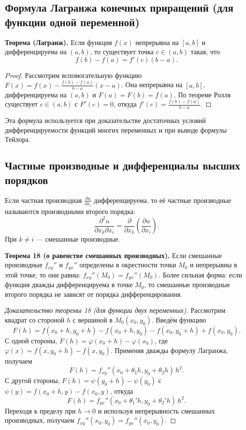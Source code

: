 \documentclass{article}
\theoremstyle{definition}
\begin{document}
\subsection{Формула Лагранжа конечных приращений (для функции одной переменной)}
\textbf{Теорема (Лагранж).} Если функция $f(x)$ непрерывна на $[a,b]$ и дифференцируема на $(a,b)$, то существует точка $c\in(a,b)$ такая, что
\[
f(b)-f(a)=f'(c)(b-a).
\]
\begin{proof}
Рассмотрим вспомогательную функцию $F(x)=f(x)-\frac{f(b)-f(a)}{b-a}(x-a)$. Она непрерывна на $[a,b]$, дифференцируема на $(a,b)$ и $F(a)=F(b)=f(a)$. По теореме Ролля существует $c\in(a,b)$ с $F'(c)=0$, откуда $f'(c)=\frac{f(b)-f(a)}{b-a}$.
\end{proof}
Эта формула используется при доказательстве достаточных условий дифференцируемости функций многих переменных и при выводе формулы Тейлора.

\subsection{Частные производные и дифференциалы высших порядков}
Если частная производная $\frac{\partial u}{\partial x_i}$ дифференцируема, то её частные производные называются производными второго порядка:
\[
\frac{\partial^2 u}{\partial x_k\partial x_i}=\frac{\partial}{\partial x_k}\left(\frac{\partial u}{\partial x_i}\right).
\]
При $k\neq i$ — смешанные производные.

\textbf{Теорема 18 (о равенстве смешанных производных).} Если смешанные производные $f_{xy}''$ и $f_{yx}''$ определены в окрестности точки $M_0$ и непрерывны в этой точке, то они равны: $f_{xy}''(M_0)=f_{yx}''(M_0)$. Более сильная форма: если функция дважды дифференцируема в точке $M_0$, то смешанные производные второго порядка не зависят от порядка дифференцирования.

\begin{proof}[Доказательство теоремы 18 (для функции двух переменных)]
Рассмотрим квадрат со стороной $h$ с вершиной в $M_0(x_0,y_0)$. Введём функцию
\[
F(h)=f(x_0+h,y_0+h)-f(x_0+h,y_0)-f(x_0,y_0+h)+f(x_0,y_0).
\]
С одной стороны, $F(h)=\varphi(x_0+h)-\varphi(x_0)$, где $\varphi(x)=f(x,y_0+h)-f(x,y_0)$. Применяя дважды формулу Лагранжа, получаем
\[
F(h)=f_{xy}''(x_0+\theta_1h,y_0+\theta_2h)\,h^2.
\]
С другой стороны, $F(h)=\psi(y_0+h)-\psi(y_0)$ с $\psi(y)=f(x_0+h,y)-f(x_0,y)$, откуда
\[
F(h)=f_{yx}''(x_0+\theta_1'h,y_0+\theta_2'h)\,h^2.
\]
Переходя к пределу при $h\to0$ и используя непрерывность смешанных производных, получаем $f_{xy}''(x_0,y_0)=f_{yx}''(x_0,y_0)$.
\end{proof}
\end{document}
